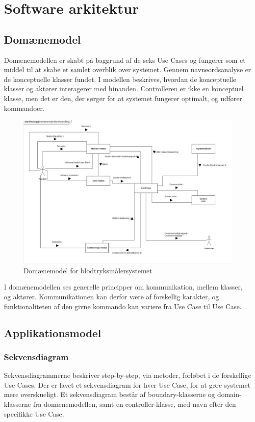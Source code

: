 \section{Software arkitektur}

\subsection{Domænemodel}
Domænemodellen er skabt på baggrund af de seks Use Cases og fungerer som et middel til at skabe et samlet overblik over systemet. Gennem navneordsanalyse er de konceptuelle klasser fundet. I modellen beskrives, hvordan de konceptuelle klasser og aktører interagerer med hinanden. Controlleren er ikke en konceptuel klasse, men det er den, der sørger for at systemet fungerer optimalt, og udfører kommandoer.

\begin{figure}[H]
	\centering
	\includegraphics[width=1 \textwidth]{Figurer/screenshot}
	\caption{Domænemodel for blodtryksmålersystemet}
\end{figure}
I domænemodellen ses generelle principper om kommunikation, mellem klasser, og aktører. Kommunikationen kan derfor være af forskellig karakter, og funktionaliteten af den givne kommando kan variere fra Use Case til Use Case.

\subsection{Applikationsmodel}

\subsubsection{Sekvensdiagram}
Sekvensdiagrammerne beskriver step-by-step, via metoder, forløbet i de forskellige Use Cases. Der er lavet et sekvensdiagram for hver Use Case, for at gøre systemet mere overskueligt. Et sekvensdiagram består af boundary-klasserne og domain-klasserne fra domænemodellen, samt en controller-klasse, med navn efter den specifikke Use Case.

